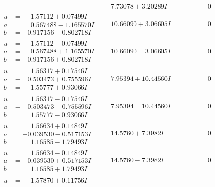 \documentclass[1p]{elsarticle_modified}
\theoremstyle{definition}
\begin{document}
$$\begin{array}{c|c|c}
 & \phantom{-}7.73078 + 3.20289 I & \phantom{-0.000000 } 0 \\ \hline\begin{aligned}
u &= \phantom{-}1.57112 + 0.07499 I \\
a &= \phantom{-}0.567488 - 1.165570 I \\
b &= -0.917156 - 0.802718 I\end{aligned}
 & \phantom{-}10.66090 + 3.06605 I & \phantom{-0.000000 } 0 \\ \hline\begin{aligned}
u &= \phantom{-}1.57112 - 0.07499 I \\
a &= \phantom{-}0.567488 + 1.165570 I \\
b &= -0.917156 + 0.802718 I\end{aligned}
 & \phantom{-}10.66090 - 3.06605 I & \phantom{-0.000000 } 0 \\ \hline\begin{aligned}
u &= \phantom{-}1.56317 + 0.17546 I \\
a &= -0.503473 + 0.755596 I \\
b &= \phantom{-}1.55777 + 0.93066 I\end{aligned}
 & \phantom{-}7.95394 + 10.44560 I & \phantom{-0.000000 } 0 \\ \hline\begin{aligned}
u &= \phantom{-}1.56317 - 0.17546 I \\
a &= -0.503473 - 0.755596 I \\
b &= \phantom{-}1.55777 - 0.93066 I\end{aligned}
 & \phantom{-}7.95394 - 10.44560 I & \phantom{-0.000000 } 0 \\ \hline\begin{aligned}
u &= \phantom{-}1.56634 + 0.14849 I \\
a &= -0.039530 - 0.517153 I \\
b &= \phantom{-}1.16585 - 1.79493 I\end{aligned}
 & \phantom{-}14.5760 + 7.3982 I & \phantom{-0.000000 } 0 \\ \hline\begin{aligned}
u &= \phantom{-}1.56634 - 0.14849 I \\
a &= -0.039530 + 0.517153 I \\
b &= \phantom{-}1.16585 + 1.79493 I\end{aligned}
 & \phantom{-}14.5760 - 7.3982 I & \phantom{-0.000000 } 0 \\ \hline\begin{aligned}
u &= \phantom{-}1.57870 + 0.11756 I \\

\end{aligned}
\end{array}$$
\end{document}

